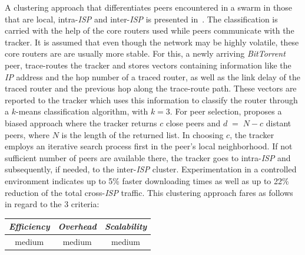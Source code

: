 A clustering approach that differentiates peers encountered in a swarm
in those that are local, intra-\emph{ISP} and inter-\emph{ISP} is 
presented in~\cite{QLZG2009}.
The classification is carried with the help of the core routers used 
while peers communicate with the tracker. It is assumed that even though the
network may be highly volatile, these core routers are are usually more stable.
For this, a newly arriving
{\sl BitTorrent} peer, trace-routes the tracker and stores vectors containing
information like the \emph{IP} address and the hop number of a traced router, as well as the
link delay of the traced router and the previous hop along the trace-route path.
These vectors are reported to the tracker which uses
this information
to classify the router through a $k$-means classification algorithm, with $k = 3$. 
For peer selection, \cite{QLZG2009} proposes a biased approach 
where the tracker returns $c$ close peers 
and $d\;=\;N-c$ distant peers, where $N$ is the length of the returned list. 
In choosing $c$, the tracker employs an iterative search process
first in the peer's local neighborhood. If not sufficient number of 
peers are available there, the tracker goes to intra-\emph{ISP} 
and subsequently, if needed, to the inter-\emph{ISP} cluster. 
Experimentation in a controlled environment indicates up to
5\% faster downloading times as well as up to 22\% reduction of 
the total cross-\emph{ISP} traffic.
This clustering approach fares as follows in regard 
to the $3$ criteria:
\begin{center}
{\footnotesize
\begin{tabular}{ccc}
\emph{Efficiency} & \emph{Overhead} & \emph{Scalability} \\
\hline
medium &
medium &
medium
\end{tabular}
}
\end{center}

